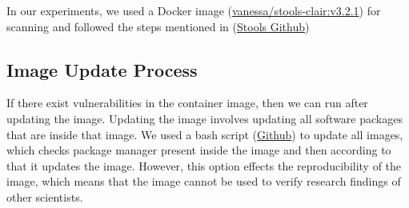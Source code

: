 \documentclass[a4paper,num-refs]{oup-contemporary}
\begin{document}
\begin{Comments}
In our experiments, we used a Docker image (\href{https://hub.docker.com/r/vanessa/stools-clair}{vanessa/stools-clair:v3.2.1})
for scanning and followed the steps mentioned in (\href{https://github.com/singularityhub/stools}{Stools Github})

\subsection{Image Update Process}

If there exist vulnerabilities in the container image, then we can
run after updating the
image. Updating the image involves updating all software packages that are
inside that image. We used a bash script (\href{https://github.com/kaurbhupinder/Vulnerability-Analysis}{Github}) 
to update all images, which checks
package manager present inside the image and then according to that it
updates the image. However, this option effects the reproducibility
of the image, which means that the image cannot be used to verify research
findings of other scientists.

\end{Comments}
\end{document}
